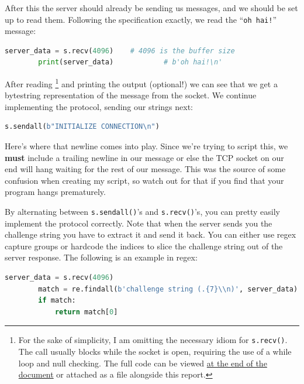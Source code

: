 \documentclass[11pt]{article}
\begin{document}
    After this the server should already be sending us messages, and we should be set up to read them. Following the specification exactly, we read the ``\verb`oh hai!`'' message:

    \begin{lstlisting}[gobble=8,label={lst:script-reading-first},language=Python]
        server_data = s.recv(4096)    # 4096 is the buffer size
        print(server_data)            # b'oh hai!\n'
    \end{lstlisting}

    After reading \footnote{For the sake of simplicity, I am omitting the necessary idiom for \texttt{s.recv()}. The call usually blocks while the socket is open, requiring the use of a while loop and null checking. The full code can be viewed \hyperref[sec:full-optimized-code]{at the end of the document} or attached as a file alongside this report.} and printing the output (optional!) we can see that we get a bytestring representation of the message from the socket. We continue implementing the protocol, sending our strings next:

    \begin{lstlisting}[gobble=8,label={lst:script-writing-first},language=Python]
        s.sendall(b"INITIALIZE CONNECTION\n")
    \end{lstlisting}

    Here's where that newline comes into play. Since we're trying to script this, we \textbf{must} include a trailing newline in our message or else the TCP socket on our end will hang waiting for the rest of our message. This was the source of some confusion when creating my script, so watch out for that if you find that your program hangs prematurely.

    \bigskip

    By alternating between \verb`s.sendall()`'s and \verb`s.recv()`'s, you can pretty easily implement the protocol correctly. Note that when the server sends you the challenge string you have to extract it and send it back. You can either use regex capture groups or hardcode the indices to slice the challenge string out of the server response. The following is an example in regex:

    \begin{lstlisting}[gobble=8,label={lst:regex-extract},language=Python]
        server_data = s.recv(4096)
        match = re.findall(b'challenge string (.{7}\\n)', server_data)
        if match:
            return match[0]
    \end{lstlisting}
\end{document}
